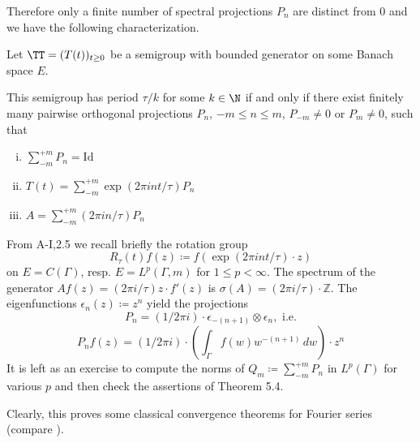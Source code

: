 Therefore only a finite number of spectral projections $P_{n}$ are distinct from $0$ and we have the following characterization.

\begin{corollary}\label{cor:a3-5.5}

Let $\TT = (T(t))_{t \geq 0}$ be a semigroup with bounded generator on some Banach space $E$.

This semigroup has period $\tau/k$ for some $k \in \N$ if and only if there exist finitely many pairwise orthogonal projections $P_{n}$, $-m \leq n \leq m$, $P_{-m} \neq 0$ or $P_{m} \neq 0$, such that
\begin{enumerate}[(i)]
\item 
$\sum_{-m}^{+m} P_{n} = \text{Id}$

\item 
$T(t) = \sum_{-m}^{+m} \exp(2\pi int/\tau)P_{n}$

\item 
$A = \sum_{-m}^{+m} (2\pi in/\tau)P_{n}$

\end{enumerate}
\end{corollary}

\begin{example}\label{ex:a3-5.6}

From A-I,2.5 we recall briefly the rotation group
\[
R_{\tau}(t)f(z) \coloneqq f(\exp(2\pi int/\tau) \cdot z)
\]
on $E = C(\Gamma)$, resp. $E = L^{p}(\Gamma,m)$ for $1 \leq p < \infty$.
The spectrum of the generator\quad
$Af(z) = (2\pi i/\tau)z \cdot f'(z)$\quad
is \quad $\sigma(A) = (2\pi i/\tau)\cdot\mathbb{Z}$.
The eigenfunctions $\epsilon_{n}(z) \coloneqq z^{n}$ yield the projections
\[
P_{n} = (1/2\pi i)\cdot\epsilon_{-(n+1)} \otimes \epsilon_{n}, \text{ i.e.}
\]
\[
P_{n}f(z) = (1/2\pi i)\cdot(\int_{\Gamma} f(w)w^{-(n+1)} \, dw)\cdot z^{n}
\]
It is left as an exercise to compute the norms of $Q_{m} \coloneqq \sum_{-m}^{+m} P_{n}$ in $L^{p}(\Gamma)$ for various $p$ and then check the assertions of Theorem 5.4.

Clearly, this proves some classical convergence theorems for Fourier series (compare \citet[Chap.8.1]{davies:1980}).
\end{example}

